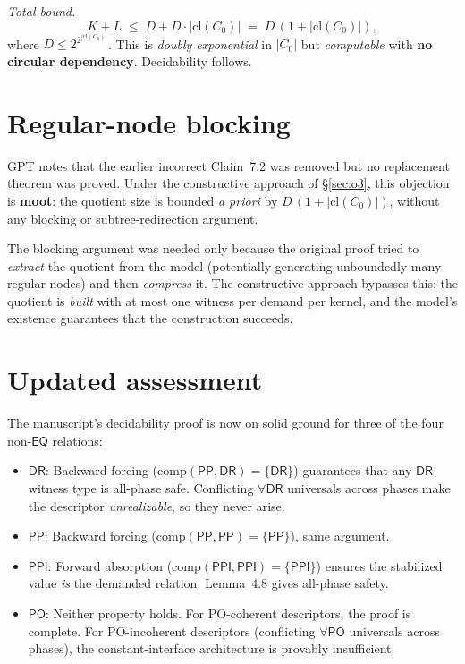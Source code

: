 \documentclass[11pt]{article}
\begin{document}
\medskip\noindent\textit{Total bound.}\;
\[
K + L \;\le\; D + D \cdot |\mathrm{cl}(C_0)| \;=\;
D \,(1 + |\mathrm{cl}(C_0)|),
\]
where $D \le 2^{2^{|\mathrm{cl}(C_0)|}}$.  This is
\emph{doubly exponential} in $|C_0|$ but \emph{computable} with
\textbf{no circular dependency}.  Decidability follows.


\section{Regular-node blocking}
\label{sec:o4}

GPT notes that the earlier incorrect Claim~7.2 was removed but no
replacement theorem was proved.  Under the constructive approach of
\S\ref{sec:o3}, this objection is \textbf{moot}: the quotient size
is bounded \emph{a priori} by $D\,(1 + |\mathrm{cl}(C_0)|)$, without
any blocking or subtree-redirection argument.

The blocking argument was needed only because the original proof
tried to \emph{extract} the quotient from the model (potentially
generating unboundedly many regular nodes) and then \emph{compress}
it.  The constructive approach bypasses this: the quotient is
\emph{built} with at most one witness per demand per kernel, and the
model's existence guarantees that the construction succeeds.


\section{Updated assessment}

The manuscript's decidability proof is now on solid ground for three
of the four non-$\mathsf{EQ}$ relations:

\begin{itemize}
\item $\mathsf{DR}$: Backward forcing
  ($\mathrm{comp}(\mathsf{PP}, \mathsf{DR}) = \{\mathsf{DR}\}$)
  guarantees that any $\mathsf{DR}$-witness type is all-phase safe.
  Conflicting $\forall\mathsf{DR}$ universals across phases make
  the descriptor \emph{unrealizable}, so they never arise.
\item $\mathsf{PP}$: Backward forcing
  ($\mathrm{comp}(\mathsf{PP}, \mathsf{PP}) = \{\mathsf{PP}\}$),
  same argument.
\item $\mathsf{PPI}$: Forward absorption
  ($\mathrm{comp}(\mathsf{PPI}, \mathsf{PPI}) = \{\mathsf{PPI}\}$)
  ensures the stabilized value \emph{is} the demanded relation.
  Lemma~4.8 gives all-phase safety.
\item $\mathsf{PO}$: Neither property holds.  For PO-coherent
  descriptors, the proof is complete.  For PO-incoherent descriptors
  (conflicting $\forall\mathsf{PO}$ universals across phases), the
  constant-interface architecture is provably insufficient.
\end{itemize}
\end{document}
